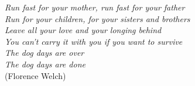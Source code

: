
\renewcommand{\epigraphname}{EPÍGRAFE}

\begin{epigrafe}
\textit{Run fast for your mother, run fast for your father} \\
\textit{Run for your children, for your sisters and brothers} \\
\textit{Leave all your love and your longing behind} \\
\textit{You can't carry it with you if you want to survive} \\ 
\textit{The dog days are over} \\
\textit{The dog days are done} \\
\hspace*{\fill} (Florence Welch)

\end{epigrafe}
